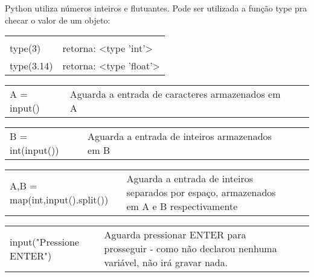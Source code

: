 \documentclass[landscape,a0paper,fontscale=0.285]{baposter} %
\begin{document}
\begin{poster}
{%
\colorbox[HTML]{CCFFFF}{} \linebreak \linebreak
Python utiliza números inteiros e flutuantes. Pode ser utilizada a função type pra checar o valor de um objeto:\\
\begin{tabular}{l l}
\textbf{}\\
type(3) & retorna: <type 'int'> \\
type(3.14) & retorna: <type 'float'> \\
\end{tabular}

\dotfill \newline

\colorbox[HTML]{CCFFFF}{}

\begin{tabular}{lp{5.3cm}lp{3.0cm}|}
A = input() & Aguarda a entrada de caracteres armazenados em A \\
\end{tabular}
\begin{tabular}{lp{4.7cm}lp{3.0cm}|}
B = int(input()) & Aguarda a entrada de inteiros armazenados em B \\
\end{tabular}
\begin{tabular}{lp{2.6cm}lp{3.0cm}|}
A,B = map(int,input().split()) & Aguarda a entrada de inteiros  separados por espaço, armazenados em A e B respectivamente \\
\end{tabular}
\begin{tabular}{lp{3.0cm}lp{3.0cm}|}
input("Pressione ENTER") & Aguarda pressionar ENTER para prosseguir - como não declarou nenhuma variável, não irá gravar nada. \\
\end{tabular}

\vspace{0.0em} %
}


\end{poster}
\end{document}
